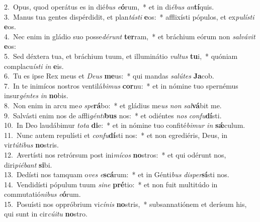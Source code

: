 {2.~}Opus, quod operátus es in dié\textit{bus} \textit{e}\textbf{ó}rum,~* et in di\textit{é}\textit{bus} \textit{an}\textbf{tí}quis.\\
{3.~}Manus tua gentes dispérdidit, et plan\textit{tá}\textit{sti} \textbf{e}os:~* afflixísti pópulos, et ex\textit{pu}\textit{lí}\textit{sti} \textbf{e}os.\\
{4.~}Nec enim in gládio suo posse\textit{dé}\textit{runt} \textbf{ter}ram,~* et bráchium eórum non \textit{sal}\textit{vá}\textit{vit} \textbf{e}os:\\
{5.~}Sed déxtera tua, et bráchium tuum, et illuminátio \textit{vul}\textit{tus} \textbf{tu}i,~* quóniam complacu\textit{í}\textit{sti} \textit{in} \textbf{e}is.\\
{6.~}Tu es ipse Rex meus et \textit{De}\textit{us} \textbf{me}us:~* qui mandas \textit{sa}\textit{lú}\textit{tes} \textbf{Ja}cob.\\
{7.~}In te inimícos nostros ventilá\textit{bi}\textit{mus} \textbf{cor}nu:~* et in nómine tuo spernémus insur\textit{gén}\textit{tes} \textit{in} \textbf{no}bis.\\
{8.~}Non enim in arcu me\textit{o} \textit{spe}\textbf{rá}bo:~* et gládius me\textit{us} \textit{non} \textit{sal}\textbf{vá}bit me.\\
{9.~}Salvásti enim nos de affli\textit{gén}\textit{ti}\textbf{bus} nos:~* et odiéntes \textit{nos} \textit{con}\textit{fu}\textbf{dí}sti.\\
{10.~}In Deo laudábimur \textit{to}\textit{ta} \textbf{di}e:~* et in nómine tuo confité\textit{bi}\textit{mur} \textit{in} \textbf{sǽ}culum.\\
{11.~}Nunc autem repulísti et \textit{con}\textit{fu}\textbf{dí}sti nos:~* et non egrediéris, Deus, in vir\textit{tú}\textit{ti}\textit{bus} \textbf{no}stris.\\
{12.~}Avertísti nos retrórsum post ini\textit{mí}\textit{cos} \textbf{no}stros:~* et qui odérunt nos, diri\textit{pi}\textit{é}\textit{bant} \textbf{si}bi.\\
{13.~}Dedísti nos tamquam o\textit{ves} \textit{e}\textbf{scá}rum:~* et in Génti\textit{bus} \textit{di}\textit{sper}\textbf{sí}sti nos.\\
{14.~}Vendidísti pópulum tuum \textit{si}\textit{ne} \textbf{pré}tio:~* et non fuit multitúdo in commutatió\textit{ni}\textit{bus} \textit{e}\textbf{ó}rum.\\
{15.~}Posuísti nos oppróbrium vi\textit{cí}\textit{nis} \textbf{no}stris,~* subsannatiónem et derísum his, qui sunt in cir\textit{cú}\textit{i}\textit{tu} \textbf{no}stro.\\

